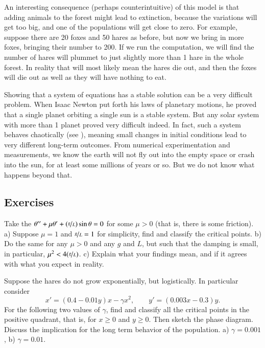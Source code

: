 An interesting consequence (perhaps counterintuitive) of this model is that adding animals to
the forest might lead to extinction, because the variations will get too
big, and one of the populations will get close to zero.  For example, suppose there are 20 foxes and 50 hares as
before, but now we bring in more foxes, bringing their number to 200.  If we
run the computation, we will find the number of hares will plummet to just
slightly more than 1 hare in the whole forest.  In reality that will most
likely mean the hares die out, and then the foxes will die out as well
as they will have nothing to eat.

Showing that a system of equations has a stable solution can be a very
difficult problem.  When Isaac Newton put forth his laws of
planetary motions, he proved that a single planet orbiting a single sun is a
stable system.  But any solar system with more than 1 planet proved very
difficult indeed.  In fact, such a system behaves chaotically (see 
), meaning small changes in initial conditions lead to very
different long-term outcomes.  From numerical experimentation and
measurements, we know the earth will not fly out into the empty space
or crash into the sun, for at least some millions of years or so.
But we do not know what happens beyond that.

\subsection{Exercises}

\begin{exercise}
Take the \emph{} $\theta '' + \mu \theta' +
(\nicefrac{g}{L})
\sin \theta = 0$ for some $\mu > 0$ (that is, there is some friction).
a) Suppose $\mu = 1$ and $\nicefrac{g}{L} = 1$ for simplicity, find and
classify the critical points.  b) Do the same for any $\mu > 0$ and any $g$
and $L$, but such that the damping is small, in particular, $\mu^2 <
4(\nicefrac{g}{L})$.
c) Explain what your findings mean, and if it agrees with what you
expect in reality.
\end{exercise}

\begin{exercise}
Suppose the hares do not grow exponentially, but logistically.  In
particular consider
\begin{equation*}
x' = (0.4-0.01y)x - \gamma x^2, \qquad y' = (0.003x-0.3)y .
\end{equation*}
For the following two values of $\gamma$,
find and classify all the critical points in the positive quadrant, that is, for
$x \geq 0$ and $y \geq 0$.  Then sketch the phase diagram.  Discuss the
implication for the long term behavior of the population.
a) $\gamma=0.001$, b) $\gamma=0.01$.
\end{exercise}

